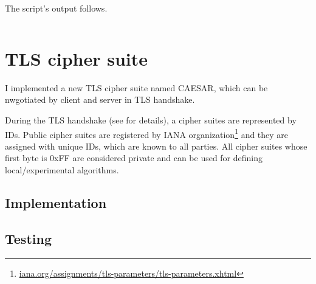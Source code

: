 \inputminted{bash}{code/test-enc.sh}

The script's output follows.

\inputminted{text}{code/test-enc.sh.out}


\section{TLS cipher suite}

I implemented a new TLS cipher suite named CAESAR, which can be nwgotiated by client and server in TLS handshake.

During the TLS handshake (see  for details), a cipher suites are represented by IDs. Public cipher suites are registered by IANA organization\footnote{\url{iana.org/assignments/tls-parameters/tls-parameters.xhtml}} and they are assigned with unique IDs, which are known to all parties. All cipher suites whose first byte is 0xFF are considered private and can be used for defining local/experimental algorithms. \cite[p.~55]{rfc2246}

\subsection{Implementation}

\subsection{Testing}
